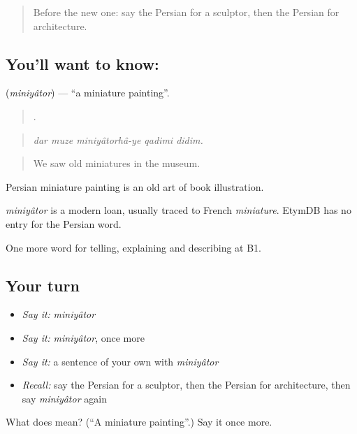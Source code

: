 \begin{quote}
Before the new one: say the Persian for a sculptor, then the Persian for architecture.
\end{quote}

\subsection*{You'll want to know: }
\textbf{} (\emph{miniyâtor}) — \textquotedblleft{}a miniature painting\textquotedblright{}.

\begin{quote}
    .
\end{quote}

\begin{quote}
\emph{dar muze miniyâtorhâ-ye qadimi didim.}
\end{quote}

\begin{quote}
We saw old miniatures in the museum.
\end{quote}

Persian miniature painting is an old art of book illustration.

\begin{cousinweb}
\emph{miniyâtor} is a modern loan, usually traced to French \emph{miniature}. EtymDB has no entry for the Persian word.
\end{cousinweb}

\begin{grammarlens}[title={What you've built}]
One more word for telling, explaining and describing at B1.
\end{grammarlens}

\subsection*{Your turn}
\begin{itemize}
\raggedright
  \item \emph{Say it:} \emph{miniyâtor}
  \item \emph{Say it:} \emph{miniyâtor}, once more
  \item \emph{Say it:} a sentence of your own with \emph{miniyâtor}
  \item \emph{Recall:} say the Persian for a sculptor, then the Persian for architecture, then say \emph{miniyâtor} again
\end{itemize}

\begin{tcolorbox}[breakable,colback=teal!4,colframe=teal!35!black,title={Before you move on}]
What does  mean? (\textquotedblleft{}A miniature painting\textquotedblright{}.) Say it once more.
\end{tcolorbox}
